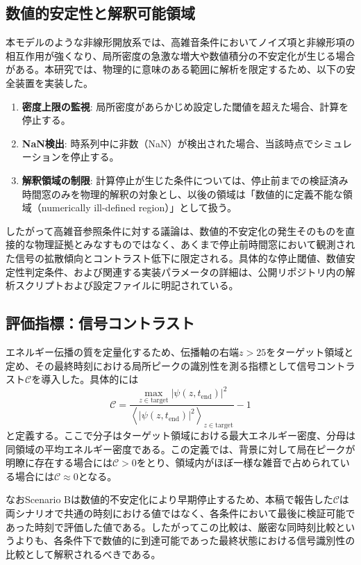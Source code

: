 \documentclass[a4paper,11pt,ja=standard,lualatex]{bxjsarticle}
\begin{document}
\subsection{数値的安定性と解釈可能領域}
本モデルのような非線形開放系では、高雑音条件においてノイズ項と非線形項の相互作用が強くなり、局所密度の急激な増大や数値積分の不安定化が生じる場合がある。本研究では、物理的に意味のある範囲に解析を限定するため、以下の安全装置を実装した。

\begin{enumerate}
    \item \textbf{密度上限の監視}: 局所密度があらかじめ設定した閾値を超えた場合、計算を停止する。
    \item \textbf{NaN検出}: 時系列中に非数（NaN）が検出された場合、当該時点でシミュレーションを停止する。
    \item \textbf{解釈領域の制限}: 計算停止が生じた条件については、停止前までの検証済み時間窓のみを物理的解釈の対象とし、以後の領域は「数値的に定義不能な領域（numerically ill-defined region）」として扱う。
\end{enumerate}

したがって高雑音参照条件に対する議論は、数値的不安定化の発生そのものを直接的な物理証拠とみなすものではなく、あくまで停止前時間窓において観測された信号の拡散傾向とコントラスト低下に限定される。具体的な停止閾値、数値安定性判定条件、および関連する実装パラメータの詳細は、公開リポジトリ内の解析スクリプトおよび設定ファイルに明記されている。

\subsection{評価指標：信号コントラスト}
エネルギー伝播の質を定量化するため、伝播軸の右端$z>25$をターゲット領域と定め、その最終時刻における局所ピークの識別性を測る指標として信号コントラスト$\mathcal{C}$を導入した。具体的には
\begin{equation}
\mathcal{C} = \frac{\max_{z\in \mathrm{target}} |\psi(z,t_{\mathrm{end}})|^2}{\left\langle |\psi(z,t_{\mathrm{end}})|^2 \right\rangle_{z\in \mathrm{target}}} - 1
\label{eq:contrast}
\end{equation}
と定義する。ここで分子はターゲット領域における最大エネルギー密度、分母は同領域の平均エネルギー密度である。この定義では、背景に対して局在ピークが明瞭に存在する場合には$\mathcal{C}>0$をとり、領域内がほぼ一様な雑音で占められている場合には$\mathcal{C}\approx 0$となる。

なおScenario Bは数値的不安定化により早期停止するため、本稿で報告した$\mathcal{C}$は両シナリオで共通の時刻における値ではなく、各条件において最後に検証可能であった時刻で評価した値である。したがってこの比較は、厳密な同時刻比較というよりも、各条件下で数値的に到達可能であった最終状態における信号識別性の比較として解釈されるべきである。
\end{document}
